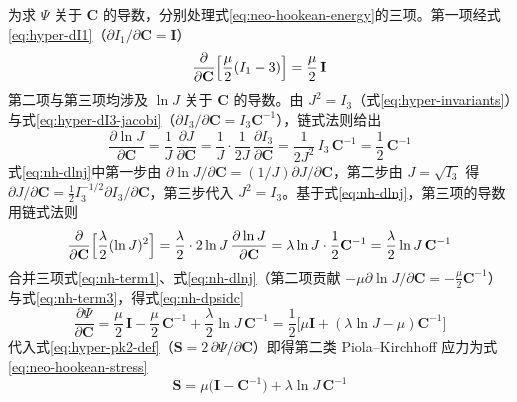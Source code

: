 为求 $\Psi$ 关于 $\mathbf{C}$ 的导数，分别处理式\eqref{eq:neo-hookean-energy}的三项。第一项经式\eqref{eq:hyper-dI1}（$\partial I_1/\partial\mathbf{C}=\mathbf{I}$）
\begin{equation}
  \frac{\partial}{\partial\mathbf{C}}\Bigl[\frac{\mu}{2}(I_1-3)\Bigr]=\frac{\mu}{2}\,\mathbf{I}
  \label{eq:nh-term1}
\end{equation}
第二项与第三项均涉及 $\ln J$ 关于 $\mathbf{C}$ 的导数。由 $J^{2}=I_3$（式\eqref{eq:hyper-invariants}）与式\eqref{eq:hyper-dI3-jacobi}（$\partial I_3/\partial\mathbf{C}=I_3\mathbf{C}^{-1}$），链式法则给出
\begin{equation}
  \frac{\partial\ln J}{\partial\mathbf{C}}
  =\frac{1}{J}\,\frac{\partial J}{\partial\mathbf{C}}
  =\frac{1}{J}\cdot\frac{1}{2J}\,\frac{\partial I_3}{\partial\mathbf{C}}
  =\frac{1}{2J^{2}}\,I_3\,\mathbf{C}^{-1}
  =\frac{1}{2}\,\mathbf{C}^{-1}
  \label{eq:nh-dlnj}
\end{equation}
式\eqref{eq:nh-dlnj}中第一步由 $\partial\ln J/\partial\mathbf{C}=(1/J)\partial J/\partial\mathbf{C}$，第二步由 $J=\sqrt{I_3}$ 得 $\partial J/\partial\mathbf{C}=\tfrac{1}{2}I_3^{-1/2}\partial I_3/\partial\mathbf{C}$，第三步代入 $J^{2}=I_3$。基于式\eqref{eq:nh-dlnj}，第三项的导数用链式法则
\begin{equation}
  \frac{\partial}{\partial\mathbf{C}}\Bigl[\frac{\lambda}{2}(\ln J)^{2}\Bigr]
  =\frac{\lambda}{2}\cdot 2\ln J\,\frac{\partial\ln J}{\partial\mathbf{C}}
  =\lambda\ln J\cdot\frac{1}{2}\mathbf{C}^{-1}
  =\frac{\lambda}{2}\ln J\,\mathbf{C}^{-1}
  \label{eq:nh-term3}
\end{equation}
合并三项式\eqref{eq:nh-term1}、式\eqref{eq:nh-dlnj}（第二项贡献 $-\mu\partial\ln J/\partial\mathbf{C}=-\tfrac{\mu}{2}\mathbf{C}^{-1}$）与式\eqref{eq:nh-term3}，得式\eqref{eq:nh-dpsidc}
\begin{equation}
  \frac{\partial\Psi}{\partial\mathbf{C}}
  =\frac{\mu}{2}\,\mathbf{I}-\frac{\mu}{2}\,\mathbf{C}^{-1}+\frac{\lambda}{2}\ln J\,\mathbf{C}^{-1}
  =\frac{1}{2}\bigl[\mu\mathbf{I}+(\lambda\ln J-\mu)\mathbf{C}^{-1}\bigr]
  \label{eq:nh-dpsidc}
\end{equation}
代入式\eqref{eq:hyper-pk2-def}（$\mathbf{S}=2\,\partial\Psi/\partial\mathbf{C}$）即得第二类 Piola--Kirchhoff 应力为式\eqref{eq:neo-hookean-stress}
\begin{equation}
  \mathbf{S}=\mu\bigl(\mathbf{I}-\mathbf{C}^{-1}\bigr)+\lambda\ln J\,\mathbf{C}^{-1}
  \label{eq:neo-hookean-stress}
\end{equation}
